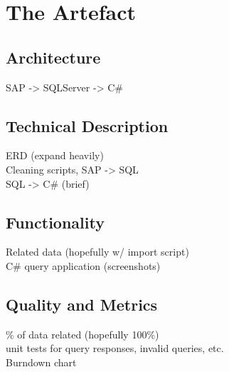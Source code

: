 \documentclass[paper=a4]{article}
\begin{document}
\section{The Artefact}
\subsection{Architecture}
SAP -> SQLServer -> C\# \\

\subsection{Technical Description}
ERD (expand heavily) \\
Cleaning scripts, SAP -> SQL \\
SQL -> C\# (brief)

\subsection{Functionality}
Related data (hopefully w/ import script) \\
C\# query application (screenshots) 

\subsection{Quality and Metrics}
\% of data related (hopefully 100\%) \\
unit tests for query responses, invalid queries, etc. \\
Burndown chart

\end{document}
